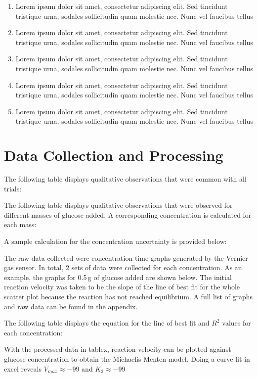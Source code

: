 \documentclass{article}
\begin{document}
\begin{enumerate}[topsep=\parskip, noitemsep]
    \item Lorem ipsum dolor sit amet, consectetur adipiscing elit. Sed tincidunt tristique urna, sodales sollicitudin quam molestie nec. Nunc vel faucibus tellus
    \item Lorem ipsum dolor sit amet, consectetur adipiscing elit. Sed tincidunt tristique urna, sodales sollicitudin quam molestie nec. Nunc vel faucibus tellus
    \item Lorem ipsum dolor sit amet, consectetur adipiscing elit. Sed tincidunt tristique urna, sodales sollicitudin quam molestie nec. Nunc vel faucibus tellus
    \item Lorem ipsum dolor sit amet, consectetur adipiscing elit. Sed tincidunt tristique urna, sodales sollicitudin quam molestie nec. Nunc vel faucibus tellus
    \item Lorem ipsum dolor sit amet, consectetur adipiscing elit. Sed tincidunt tristique urna, sodales sollicitudin quam molestie nec. Nunc vel faucibus tellus
\end{enumerate}

\section{Data Collection and Processing}
The following table displays qualitative observations that were common with all trials:

The following table displays qualitative observations that were observed for different masses of glucose added. A corresponding concentration is calculated for each mass:

A sample calculation for the concentration uncertainty is provided below:

The raw data collected were concentration-time graphs generated by the Vernier  gas sensor. In total, 2 sets of data were collected for each concentration. As an example, the graphs for 0.5\,\si{g} of glucose added are shown below. The initial reaction velocity was taken to be the slope of the line of best fit for the whole scatter plot because the reaction has not reached equilibrium. A full list of graphs and raw data can be found in the appendix.  %

The following table displays the equation for the line of best fit and $R^2$ values for each concentration:

With the processed data in tablex, reaction velocity can be plotted against glucose concentration to obtain the Michaelis Menten model. Doing a curve fit in excel reveals $V_{max} \approx -99$ and $K_2 \approx -99$
\end{document}
